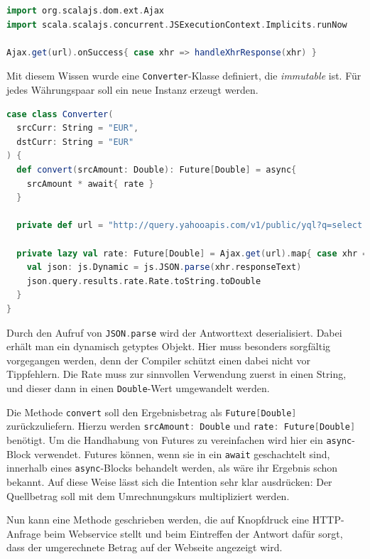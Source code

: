 \documentclass[a4paper, 12pt, hidelinks, listof=totoc, listoftables=totoc, bibliography=totoc]{scrreprt}
\newcommand{\scala}[1]{\lstinline[language=Scala, style=inline]|#1|}
\begin{document}
\begin{lstlisting}[language=Scala, caption={Futures-basierter HTTP-Aufruf mit Scala.js-Bequemlichkeitsmethode.}]
import org.scalajs.dom.ext.Ajax
import scala.scalajs.concurrent.JSExecutionContext.Implicits.runNow

Ajax.get(url).onSuccess{ case xhr => handleXhrResponse(xhr) }
\end{lstlisting}

Mit diesem Wissen wurde eine \scala{Converter}-Klasse definiert, die \emph{immutable} ist. Für jedes Währungspaar soll ein neue Instanz erzeugt werden.

\begin{lstlisting}[language=Scala, caption={Der Währungsumrechner.}]
case class Converter(
  srcCurr: String = "EUR",
  dstCurr: String = "EUR"
) {
  def convert(srcAmount: Double): Future[Double] = async{
    srcAmount * await{ rate }
  }

  private def url = "http://query.yahooapis.com/v1/public/yql?q=select * from yahoo.finance.xchange where pair in ('" + srcCurr + dstCurr + "')&format=json&env=store://datatables.org/alltableswithkeys"

  private lazy val rate: Future[Double] = Ajax.get(url).map{ case xhr =>
    val json: js.Dynamic = js.JSON.parse(xhr.responseText)
    json.query.results.rate.Rate.toString.toDouble
  }
}
\end{lstlisting}

Durch den Aufruf von \scala{JSON.parse} wird der Antworttext deserialisiert. Dabei erhält man ein dynamisch getyptes Objekt. Hier muss besonders sorgfältig vorgegangen werden, denn der Compiler schützt einen dabei nicht vor Tippfehlern. Die Rate muss zur sinnvollen Verwendung zuerst in einen String, und dieser dann in einen \scala{Double}-Wert umgewandelt werden.

Die Methode \scala{convert} soll den Ergebnisbetrag als \scala{Future[Double]} zurückzuliefern. Hierzu werden \scala{srcAmount: Double} und \scala{rate: Future[Double]} benötigt. Um die Handhabung von Futures zu vereinfachen wird hier ein \scala{async}-Block verwendet. Futures können, wenn sie in ein \scala{await} geschachtelt sind, innerhalb eines \scala{async}-Blocks behandelt werden, als wäre ihr Ergebnis schon bekannt. Auf diese Weise lässt sich die Intention sehr klar ausdrücken: Der Quellbetrag soll mit dem Umrechnungskurs multipliziert werden.

Nun kann eine Methode geschrieben werden, die auf Knopfdruck eine \ac{HTTP}-Anfrage beim Webservice stellt und beim Eintreffen der Antwort dafür sorgt, dass der umgerechnete Betrag auf der Webseite angezeigt wird.
\end{document}

